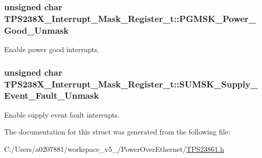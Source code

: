 \hypertarget{struct_t_p_s238_x___interrupt___mask___register__t_afe7ccff05d817d01188c24e49641a563}{
\subsubsection[{P\-G\-M\-S\-K\-\_\-\-Power\-\_\-\-Good\-\_\-\-Unmask}]{\setlength{\rightskip}{0pt plus 5cm}unsigned char T\-P\-S238\-X\-\_\-\-Interrupt\-\_\-\-Mask\-\_\-\-Register\-\_\-t\-::\-P\-G\-M\-S\-K\-\_\-\-Power\-\_\-\-Good\-\_\-\-Unmask}}\label{struct_t_p_s238_x___interrupt___mask___register__t_afe7ccff05d817d01188c24e49641a563}


Enable power good interrupts. 

\hypertarget{struct_t_p_s238_x___interrupt___mask___register__t_a85c1d4453b3757e2311c4e4ece90e095}{
\subsubsection[{S\-U\-M\-S\-K\-\_\-\-Supply\-\_\-\-Event\-\_\-\-Fault\-\_\-\-Unmask}]{\setlength{\rightskip}{0pt plus 5cm}unsigned char T\-P\-S238\-X\-\_\-\-Interrupt\-\_\-\-Mask\-\_\-\-Register\-\_\-t\-::\-S\-U\-M\-S\-K\-\_\-\-Supply\-\_\-\-Event\-\_\-\-Fault\-\_\-\-Unmask}}\label{struct_t_p_s238_x___interrupt___mask___register__t_a85c1d4453b3757e2311c4e4ece90e095}


Enable supply event fault interrupts. 



The documentation for this struct was generated from the following file\-:\begin{DoxyCompactItemize}
\item 
C\-:/\-Users/a0207881/workspace\-\_\-v5\-\_/\-Power\-Over\-Ethernet/\hyperlink{_t_p_s23861_8h}{T\-P\-S23861.\-h}\end{DoxyCompactItemize}
